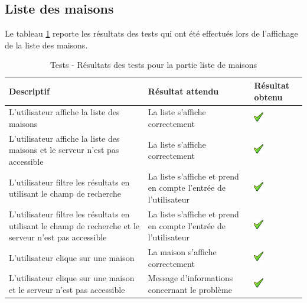 \subsection{Liste des maisons} %
\label{sub:logout}
Le tableau \ref{tab:testListMaison} reporte les résultats des tests qui ont été effectués lors de l'affichage de la liste des maisons.
\begin{table}[H]
\begin{tabularx}{\textwidth}{|X|X|m{1.5cm}|}
  \hline
  \bf{Descriptif} & \bf{Résultat attendu} & \bf{Résultat obtenu} \\
  \hline
  L'utilisateur affiche la liste des maisons&La liste s'affiche correctement & \includegraphics[width=16px]{00_media/ok.png} \\
  \hline
  L'utilisateur affiche la liste des maisons et le serveur n'est pas accessible & La liste s'affiche correctement & \includegraphics[width=16px]{00_media/ok.png} \\
\hline
  L'utilisateur filtre les résultats en utilisant le champ de recherche & La liste s'affiche et prend en compte l'entrée de l'utilisateur & \includegraphics[width=16px]{00_media/ok.png} \\
  \hline
    L'utilisateur filtre les résultats en utilisant le champ de recherche et le serveur n'est pas accessible & La liste s'affiche et prend en compte l'entrée de l'utilisateur & \includegraphics[width=16px]{00_media/ok.png} \\
  \hline
    L'utilisateur clique sur une maison & La maison s'affiche correctement & \includegraphics[width=16px]{00_media/ok.png} \\
  \hline
      L'utilisateur clique sur une maison et le serveur n'est pas accessible & Message d'informations concernant le problème & \includegraphics[width=16px]{00_media/ok.png} \\
  \hline
\end{tabularx}
\caption{Tests - Résultats des tests pour la partie liste de maisons}
\label{tab:testListMaison}
\end{table}

